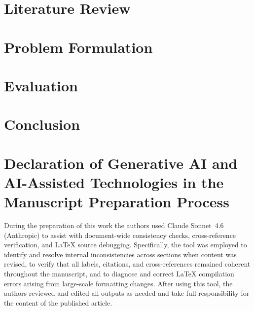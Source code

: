 \documentclass[11pt,a4paper]{article}
\theoremstyle{definition}
\theoremstyle{remark}
\begin{document}
\section{Literature Review}
\label{sec:literature}


\FloatBarrier


\section{Problem Formulation}
\label{sec:problem}


\FloatBarrier


\section{Evaluation}
\label{sec:evaluation}


\FloatBarrier


\section{Conclusion}
\label{sec:conclusion}


\FloatBarrier


\section*{Declaration of Generative AI and AI-Assisted Technologies
          in the Manuscript Preparation Process}

During the preparation of this work the authors used Claude Sonnet~4.6
(Anthropic) to assist with document-wide consistency checks, cross-reference
verification, and \LaTeX{} source debugging. Specifically, the tool was
employed to identify and resolve internal inconsistencies across sections
when content was revised, to verify that all labels, citations, and
cross-references remained coherent throughout the manuscript, and to
diagnose and correct \LaTeX{} compilation errors arising from large-scale
formatting changes. After using this tool, the authors reviewed and edited
all outputs as needed and take full responsibility for the content of the
published article.
\end{document}
